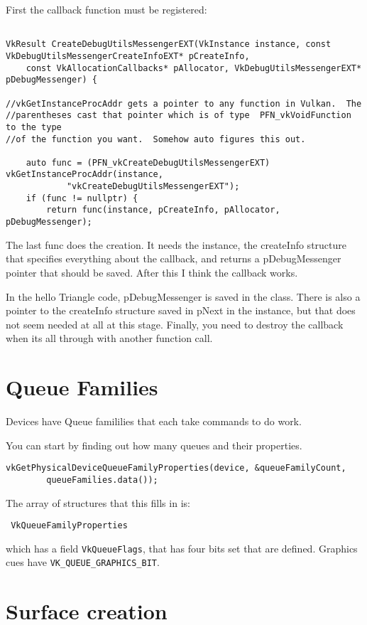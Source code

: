 \documentclass{article}
\begin{document}
First the callback function must be registered:
\begin{verbatim}

VkResult CreateDebugUtilsMessengerEXT(VkInstance instance, const VkDebugUtilsMessengerCreateInfoEXT* pCreateInfo, 
    const VkAllocationCallbacks* pAllocator, VkDebugUtilsMessengerEXT* pDebugMessenger) {
    
//vkGetInstanceProcAddr gets a pointer to any function in Vulkan.  The
//parentheses cast that pointer which is of type  PFN_vkVoidFunction to the type
//of the function you want.  Somehow auto figures this out.

	auto func = (PFN_vkCreateDebugUtilsMessengerEXT) vkGetInstanceProcAddr(instance, 
			"vkCreateDebugUtilsMessengerEXT");
    if (func != nullptr) {
        return func(instance, pCreateInfo, pAllocator, pDebugMessenger);
\end{verbatim}
The last func does the creation.  It needs the instance, the createInfo
structure that specifies everything about the callback, and returns a
pDebugMessenger pointer that should be saved.  After this I think the callback
works.  

In the hello Triangle code, pDebugMessenger is saved in the class.  There is
also a pointer to the createInfo structure saved in pNext in the instance, but
that does not seem needed at all at this stage.  Finally, you need to destroy
the callback when its all through with another function call.
\section{Queue Families}
Devices have Queue famililies that each take commands to do work. 

You can start by finding out how many queues and their properties.  
\begin{verbatim}
vkGetPhysicalDeviceQueueFamilyProperties(device, &queueFamilyCount,
		queueFamilies.data());
\end{verbatim}
The array of structures that this fills in is:
\begin{verbatim}
 VkQueueFamilyProperties
\end{verbatim}
which has a field \verb|VkQueueFlags|, that has four bits set that are defined.
Graphics cues have \verb|VK_QUEUE_GRAPHICS_BIT|.
\section{Surface creation}
\end{document}
